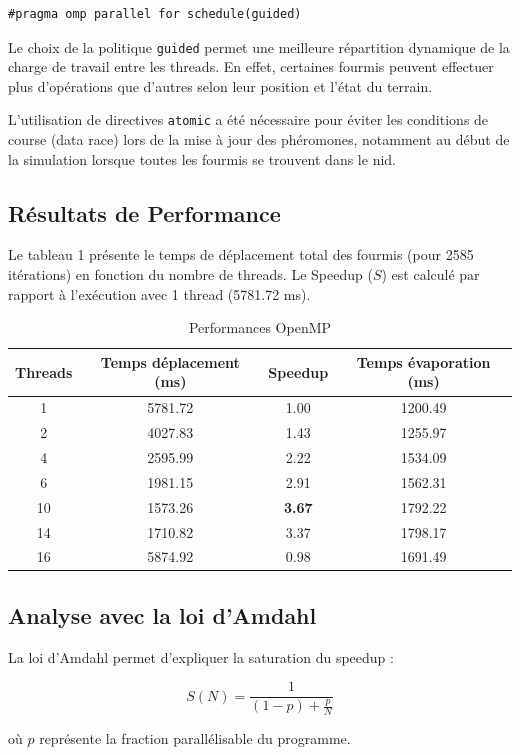 \documentclass[12pt, a4paper]{article}
\begin{document}
\begin{verbatim}
#pragma omp parallel for schedule(guided)
\end{verbatim}

Le choix de la politique \texttt{guided} permet une meilleure répartition dynamique de la charge de travail entre les threads. En effet, certaines fourmis peuvent effectuer plus d’opérations que d’autres selon leur position et l’état du terrain.

L'utilisation de directives \texttt{atomic} a été nécessaire pour éviter les conditions de course (data race) lors de la mise à jour des phéromones, notamment au début de la simulation lorsque toutes les fourmis se trouvent dans le nid.

\subsection{Résultats de Performance}
Le tableau 1 présente le temps de déplacement total des fourmis (pour 2585 itérations) en fonction du nombre de threads. Le Speedup ($S$) est calculé par rapport à l'exécution avec 1 thread (5781.72 ms).

\begin{table}[H]
\centering
\begin{tabular}{cccc}
\toprule
Threads & Temps déplacement (ms) & Speedup & Temps évaporation (ms) \\
\midrule
1 & 5781.72 & 1.00 & 1200.49 \\
2 & 4027.83 & 1.43 & 1255.97 \\
4 & 2595.99 & 2.22 & 1534.09 \\
6 & 1981.15 & 2.91 & 1562.31 \\
10 & 1573.26 & \textbf{3.67} & 1792.22 \\
14 & 1710.82 & 3.37 & 1798.17 \\
16 & 5874.92 & 0.98 & 1691.49 \\
\bottomrule
\end{tabular}
\caption{Performances OpenMP}
\end{table}

\subsection{Analyse avec la loi d’Amdahl}

La loi d’Amdahl permet d’expliquer la saturation du speedup :

\[
S(N) = \frac{1}{(1-p) + \frac{p}{N}}
\]

où $p$ représente la fraction parallélisable du programme.
\end{document}
